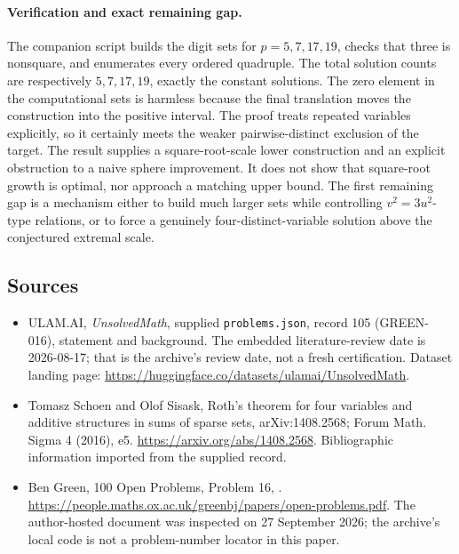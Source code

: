 \documentclass[11pt,a4paper]{article}
\begin{document}
\paragraph{Verification and exact remaining gap.}
The companion script builds the digit sets for $p=5,7,17,19$, checks that three is nonsquare, and enumerates every ordered quadruple. The total solution counts are respectively $5,7,17,19$, exactly the constant solutions. The zero element in the computational sets is harmless because the final translation moves the construction into the positive interval. The proof treats repeated variables explicitly, so it certainly meets the weaker pairwise-distinct exclusion of the target. The result supplies a square-root-scale lower construction and an explicit obstruction to a naive sphere improvement. It does not show that square-root growth is optimal, nor approach a matching upper bound. The first remaining gap is a mechanism either to build much larger sets while controlling $v^2=3u^2$-type relations, or to force a genuinely four-distinct-variable solution above the conjectured extremal scale.

\subsection{Sources}

{\small

\begin{itemize}

\item[\hypertarget{source:105:1}{S1}] ULAM.AI, \emph{UnsolvedMath}, supplied \texttt{problems.json}, record 105 (GREEN-016), statement and background. The embedded literature-review date is 2026-08-17; that is the archive’s review date, not a fresh certification. Dataset landing page: \url{https://huggingface.co/datasets/ulamai/UnsolvedMath}.

\item[\hypertarget{source:105:2}{S2}] Tomasz Schoen and Olof Sisask, Roth's theorem for four variables and additive structures in sums of sparse sets, arXiv:1408.2568; Forum Math. Sigma 4 (2016), e5. \url{https://arxiv.org/abs/1408.2568}. Bibliographic information imported from the supplied record.

\item[\hypertarget{source:105:3}{S3}] Ben Green, 100 Open Problems, Problem 16, . \url{https://people.maths.ox.ac.uk/greenbj/papers/open-problems.pdf}. The author-hosted document was inspected on 27 September 2026; the archive’s local code is not a problem-number locator in this paper.

\end{itemize}

}

\label{end:105}
\end{document}
